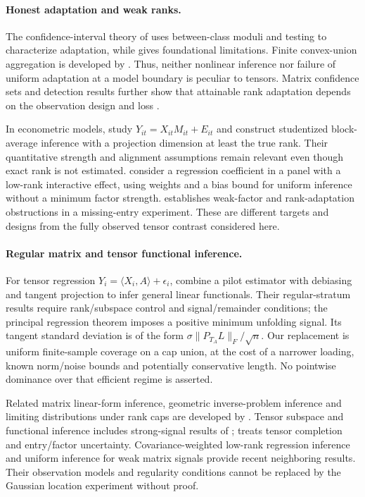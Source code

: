 \documentclass[11pt]{article}
\theoremstyle{remark}
\newcommand{\ip}[2]{\langle #1,#2\rangle}
\newcommand{\norm}[1]{\lVert #1\rVert}
\begin{document}
\paragraph{Honest adaptation and weak ranks.}
The confidence-interval theory of \citet{cailow2004} uses between-class moduli and testing to characterize adaptation, while \citet{low1997} gives foundational limitations. Finite convex-union aggregation is developed by \citet{juditskynemirovski2020}. Thus, neither nonlinear inference nor failure of uniform adaptation at a model boundary is peculiar to tensors. Matrix confidence sets and detection results further show that attainable rank adaptation depends on the observation design and loss \citep{carpentieretal2018,carpentiernickl2015}.

In econometric models, \citet{choi2026} study $Y_{it}=X_{it}M_{it}+E_{it}$ and construct studentized block-average inference with a projection dimension at least the true rank. Their quantitative strength and alignment assumptions remain relevant even though exact rank is not estimated. \citet{armstrong2026} consider a regression coefficient in a panel with a low-rank interactive effect, using weights and a bias bound for uniform inference without a minimum factor strength. \citet{zhu2019} establishes weak-factor and rank-adaptation obstructions in a missing-entry experiment. These are different targets and designs from the fully observed tensor contrast considered here.

\paragraph{Regular matrix and tensor functional inference.}
For tensor regression $Y_i=\ip{X_i}A+\epsilon_i$, \citet{xu2025} combine a pilot estimator with debiasing and tangent projection to infer general linear functionals. Their regular-stratum results require rank/subspace control and signal/remainder conditions; the principal regression theorem imposes a positive minimum unfolding signal. Its tangent standard deviation is of the form $\sigma\norm{P_{T_A}L}_F/\sqrt n$. Our replacement is uniform finite-sample coverage on a cap union, at the cost of a narrower loading, known norm/noise bounds and potentially conservative length. No pointwise dominance over that efficient regime is asserted.

Related matrix linear-form inference, geometric inverse-problem inference and limiting distributions under rank caps are developed by \citet{xiayuan2021,cailiangrakhlin2016,carpentierkim2018}. Tensor subspace and functional inference includes strong-signal results of \citet{xiazhangzhou2022,agterberg2024}; \citet{caipoorchen2023} treats tensor completion and entry/factor uncertainty. Covariance-weighted low-rank regression inference \citep{ke2026} and uniform inference for weak matrix signals \citep{bykhovskaya2025} provide recent neighboring results. Their observation models and regularity conditions cannot be replaced by the Gaussian location experiment without proof.
\end{document}
